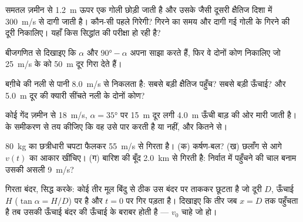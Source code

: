 \begin{exercise}[$\star\star$]\label{exo:g12:projectile-motion:10}
समतल ज़मीन से \qty{1.2}{m} ऊपर एक गोली छोड़ी जाती है और उसके जैसी दूसरी क्षैतिज
दिशा में \qty{300}{m/s} से दागी जाती है। कौन-सी पहले गिरेगी? गिरने का समय और दागी गई
गोली के गिरने की दूरी निकालिए। यहाँ किस सिद्धांत की परीक्षा हो रही है?
\end{exercise}

\begin{exercise}[$\star\star$]\label{exo:g12:projectile-motion:11}
बीजगणित से दिखाइए कि $\alpha$ और $\ang{90} - \alpha$ अपना  साझा करते हैं, फिर
वे दोनों कोण निकालिए जो \qty{25}{m/s} के  को \qty{50}{m} दूर गिरा
देते हैं।
\end{exercise}

\begin{exercise}[$\star\star\star$]\label{exo:g12:projectile-motion:12}
बग़ीचे की नली से पानी \qty{8.0}{m/s} से निकलता है: सबसे बड़ी क्षैतिज पहुँच? सबसे बड़ी
 ऊँचाई? और \qty{5.0}{m} दूर की क्यारी सींचते नली के दोनों कोण?
\end{exercise}

\begin{exercise}[$\star\star\star$]\label{exo:g12:projectile-motion:13}
कोई गेंद ज़मीन से \qty{18}{m/s}, $\alpha = \ang{35}$ पर \qty{15}{m} दूर लगी \qty{4.0}{m} ऊँची बाड़ की ओर
मारी जाती है।  के समीकरण से तय कीजिए कि वह उसे पार करती है या
नहीं, और कितने से।
\end{exercise}

\begin{exercise}[$\star\star\star$]\label{exo:g12:projectile-motion:14}
\qty{80}{kg} का छत्रीधारी चपटा फैलकर  \qty{55}{m/s} से गिरता है।
(क) कर्षण-बल? (ख) छलाँग से आगे $v(t)$ का आकार खींचिए। (ग) बारिश की
बूँद \qty{2.0}{km} से गिरती है: निर्वात में पहुँचने की चाल बनाम उसकी असली \qty{9}{m/s}?
\end{exercise}

\begin{exercise}[$\star\star\star$]\label{exo:g12:projectile-motion:15}
गिरता बंदर, सिद्ध करके: कोई तीर मूल बिंदु से ठीक उस बंदर पर ताककर छूटता है जो
दूरी $D$, ऊँचाई $H$ ($\tan\alpha = H/D$) पर है और $t = 0$ पर गिर पड़ता है।
दिखाइए कि तीर जब $x = D$ तक पहुँचता है तब उसकी ऊँचाई बंदर की ऊँचाई के बराबर
होती है --- $v_0$ चाहे जो हो।
\end{exercise}

